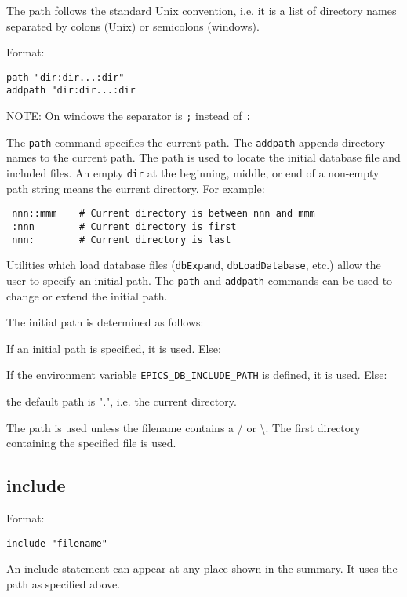 The path follows the standard Unix convention, i.e. it is a list of directory names separated by colons (Unix) or 
semicolons (windows).

Format:

\begin{verbatim}path "dir:dir...:dir"
addpath "dir:dir...:dir
\end{verbatim}NOTE: On windows the separator is \verb|;| instead of \verb|:|

The \verb|path| command specifies the current path. The \verb|addpath| appends directory names to the current path. The path is 
used to locate the initial database file and included files. An empty \verb|dir| at the beginning, middle, or end of a non-empty 
path string means the current directory. For example:

\begin{verbatim} nnn::mmm    # Current directory is between nnn and mmm
 :nnn        # Current directory is first
 nnn:        # Current directory is last
\end{verbatim}Utilities which load database files (\verb|dbExpand|, \verb|dbLoadDatabase|, etc.) allow the user to specify an initial path. The 
\verb|path| and \verb|addpath| commands can be used to change or extend the initial path.

The initial path is determined as follows:

\begin{description}\item If an initial path is specified, it is used. Else:

\item If the environment variable \verb|EPICS_DB_INCLUDE_PATH| is defined, it is used. Else:

\item the default path is ".", i.e. the current directory.

\end{description}The path is used unless the filename contains a / or \textbackslash{}. The first directory containing the specified file is used.

\subsection{include}

Format:

\begin{verbatim}include "filename"
\end{verbatim}An include statement can appear at any place shown in the summary. It uses the path as specified above.

